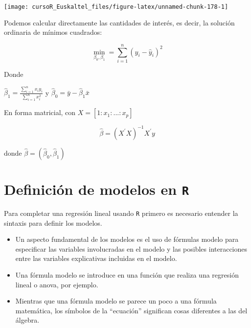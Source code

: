 \documentclass[]{book}
\begin{document}
\begin{center}\texttt{[image: cursoR\_Euskaltel\_files/figure-latex/unnamed-chunk-178-1]} \end{center}

Podemos calcular directamente las cantidades de interés, es decir, la
solución ordinaria de mínimos cuadrados:

\[
\min_{\beta_0,\beta_1} = \sum_{i=1}^{n} (y_i - \hat{y}_i)^2  
\]

Donde

\(\hat{\beta}_1 = \frac{\sum_{i=1}^{n}x_iy_i}{\sum_{i=1}^n x_i^2}\) y
\(\hat{\beta}_0 = \bar{y} - \hat{\beta}_1\bar{x}\)

En forma matricial, con \(X=[1:x_1:...:x_p]\)

\[
\hat{\beta}  = (X^\prime X)^{-1} X^\prime y
\]

donde \(\hat{\beta} = (\hat{\beta}_0,\hat{\beta}_1)\)

\section{\texorpdfstring{Definición de modelos en
\texttt{R}}{Definición de modelos en R}}\label{definicion-de-modelos-en-r}

Para completar una regresión lineal usando \texttt{R} primero es
necesario entender la sintaxis para definir los modelos.

\begin{itemize}
\item
  Un aspecto fundamental de los modelos es el uso de fórmulas modelo
  para especificar las variables involucradas en el modelo y las
  posibles interacciones entre las variables explicativas incluidas en
  el modelo.
\item
  Una fórmula modelo se introduce en una función que realiza una
  regresión lineal o anova, por ejemplo.
\item
  Mientras que una fórmula modelo se parece un poco a una fórmula
  matemática, los símbolos de la ``ecuación'' significan cosas
  diferentes a las del álgebra.
\end{itemize}
\end{document}
